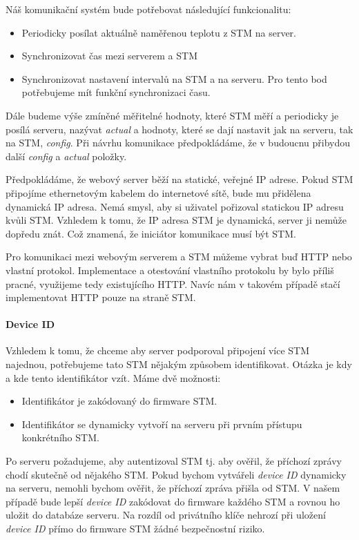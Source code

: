 
Náš komunikační systém bude potřebovat následující funkcionalitu:
\begin{itemize}
    \item Periodicky posílat aktuálně naměřenou teplotu z STM na server.
    \item Synchronizovat čas mezi serverem a STM
    \item Synchronizovat nastavení intervalů na STM a na serveru.
          Pro tento bod potřebujeme mít funkční synchronizaci času.
\end{itemize}

Dále budeme výše zmíněné měřitelné hodnoty, které STM měří a periodicky je posílá
serveru, nazývat \emph{actual} a hodnoty, které se dají nastavit jak na serveru, tak na
STM, \emph{config}.
Při návrhu komunikace předpokládáme, že v budoucnu přibydou další \emph{config} a \emph{actual} položky.

Předpokládáme, že webový server běží na statické, veřejné IP adrese.
Pokud STM připojíme ethernetovým kabelem do internetové sítě, bude mu přidělena dynamická IP adresa.
Nemá smysl, aby si uživatel pořizoval statickou IP adresu kvůli STM.
Vzhledem k tomu, že IP adresa STM je dynamická, server ji nemůže dopředu znát.
Což znamená, že iniciátor komunikace musí být STM.

Pro komunikaci mezi webovým serverem a STM můžeme vybrat buď HTTP nebo vlastní protokol.
Implementace a otestování vlastního protokolu by bylo příliš pracné, využijeme tedy existujícího HTTP.
Navíc nám v takovém případě stačí implementovat HTTP pouze na straně STM.

\paragraph{Device ID}
Vzhledem k tomu, že chceme aby server podporoval připojení více STM najednou, potřebujeme
tato STM nějakým způsobem identifikovat.
Otázka je kdy a kde tento identifikátor vzít.
Máme dvě možnosti:
\begin{itemize}
  \item Identifikátor je zakódovaný do firmware STM.
  \item Identifikátor se dynamicky vytvoří na serveru při prvním přístupu konkrétního STM.
\end{itemize}
Po serveru požadujeme, aby autentizoval STM tj. aby ověřil, že příchozí zprávy chodí skutečně
od nějakého STM.
Pokud bychom vytvářeli \emph{device ID} dynamicky na serveru, nemohli bychom ověřit, že
příchozí zpráva přišla od STM.
V našem případě bude lepší \emph{device ID} zakódovat do firmware každého STM a rovnou ho uložit
do databáze serveru.
Na rozdíl od privátního klíče nehrozí při uložení \emph{device ID} přímo do firmware STM
žádné bezpečnostní riziko.

